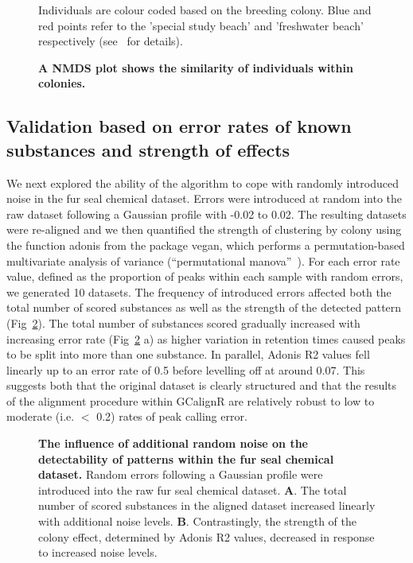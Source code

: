 \documentclass[10pt,letterpaper]{article}
\begin{document}
\begin{figure}[htbp]
\centering
\caption{\textbf{A NMDS plot shows the similarity of individuals within colonies.}}
Individuals are colour coded based on the breeding colony. Blue and red points refer to the 'special study beach' and 'freshwater beach' respectively (see~\cite{Stoffel.2015} for details).
\label{Fig:Fig5}
\end{figure} 

\subsection*{Validation based on error rates of known substances and  strength of effects}

We next explored the ability of the algorithm to cope with randomly introduced noise in the fur seal chemical dataset.  Errors were introduced at random into the raw dataset following a Gaussian profile with -0.02 to 0.02.  The resulting datasets were re-aligned and we then quantified the strength of clustering by colony using the function adonis from the package vegan, which performs a permutation-based multivariate analysis of variance (“permutational manova”~\cite{Anderson.2001}). For each error rate value, defined as the proportion of peaks within each sample with random errors, we generated 10 datasets.  The frequency of introduced errors affected both the total number of scored substances as well as the strength of the detected pattern (Fig~\ref{Fig:Fig6}). The total number of substances scored gradually increased with increasing error rate (Fig~\ref{Fig:Fig6} a) as higher variation in retention times caused peaks to be split into more than one substance.  In parallel, Adonis R2 values fell linearly up to an error rate of 0.5 before levelling off at around 0.07. This suggests both that the original dataset is clearly structured and that the results of the alignment procedure within GCalignR are relatively robust to low to moderate (i.e. $<$ 0.2) rates of peak calling error.

\begin{figure}[htbp]
\centering
\caption{\textbf{The influence of additional random noise on the detectability of patterns within the fur seal chemical dataset.}
Random errors following a Gaussian profile were introduced into the raw fur seal chemical dataset. \textbf{A}. The total number of scored substances in the aligned dataset increased linearly with additional noise levels. \textbf{B}. Contrastingly, the strength of the colony effect, determined by Adonis R2 values, decreased in response to increased noise levels.}
\label{Fig:Fig6}
\end{figure} 
\end{document}
